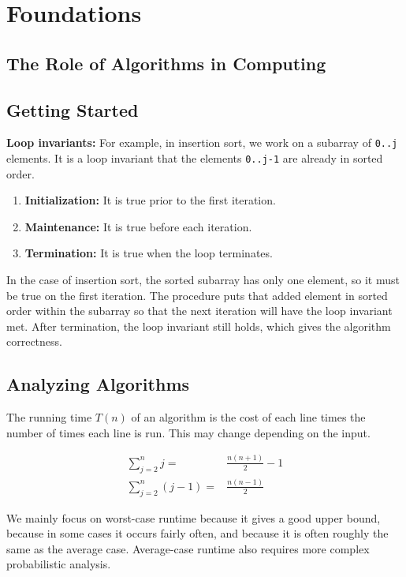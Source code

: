 \documentclass[12pt]{article}
\begin{document}
\section{Foundations}

\subsection{The Role of Algorithms in Computing}

\subsection{Getting Started}
\textbf{Loop invariants:} For example, in insertion sort, we work on a subarray of \texttt{0..j} elements. It is a loop invariant that the elements \texttt{0..j-1} are already in sorted order.
\begin{enumerate}
    \item \textbf{Initialization:} It is true prior to the first iteration.
    \item \textbf{Maintenance:} It is true before each iteration.
    \item \textbf{Termination:} It is true when the loop terminates.
\end{enumerate}
In the case of insertion sort, the sorted subarray has only one element, so it must be true on the first iteration. The procedure puts that added element in sorted order within the subarray so that the next iteration will have the loop invariant met. After termination, the loop invariant still holds, which gives the algorithm correctness.

\subsection{Analyzing Algorithms}
The running time $T(n)$ of an algorithm is the cost of each line times the number of times each line is run. This may change depending on the input.

\begin{align*}
    \sum_{j=2}^n j =& \frac{n(n+1)}{2} - 1 \\
    \sum_{j=2}^n (j-1) =& \frac{n(n-1)}{2}
\end{align*}

We mainly focus on worst-case runtime because it gives a good upper bound, because in some cases it occurs fairly often, and because it is often roughly the same as the average case. Average-case runtime also requires more complex probabilistic analysis.
\end{document}
